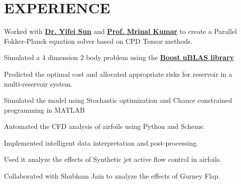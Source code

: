 \documentclass[]{resume}
\begin{document}
\hfill
\begin{minipage}[t]{0.66\textwidth}


\section{EXPERIENCE}
\vspace{\topsep} %
\begin{tightemize}
\item Worked with \textbf{\href{http://plaza.ufl.edu/yfsun/index.html}{Dr. Yifei Sun}} and
	\textbf{\href{http://web.mae.ufl.edu/~mrinalkumar/index.html}{Prof. Mrinal Kumar}} to create a Parallel
	Fokker-Planck equation solver based on CPD Tensor methods.
\item Simulated a 4 dimension 2 body problem using the
	\textbf{\href{http://www.boost.org/doc/libs/1_58_0/libs/numeric/ublas/doc}{Boost uBLAS library}}
\end{tightemize}
\begin{tightemize}
\item Predicted the optimal cost and allocated appropriate risks for reservoir in a multi-reservoir system.
\item Simulated the model using Stochastic optimization and Chance constrained programming in MATLAB
\end{tightemize}
\sectionsep

\begin{tightemize}
\item Automated the CFD analysis of airfoils using Python and Scheme.
\item Implemented intelligent data interpretation and post-processing.
\item Used it analyze the effects of Synthetic jet active flow control in airfoils.
\item Collaborated with Shubham Jain to analyze the effects of Gurney Flap.
\end{tightemize}
\sectionsep



\end{minipage}
\end{document}
